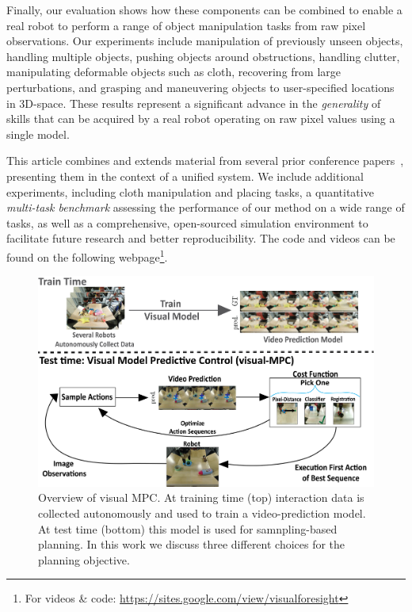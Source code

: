 Finally, our evaluation shows how these components can be combined to enable a real robot to perform a range of object manipulation tasks from raw pixel observations. Our experiments include manipulation of previously unseen objects, handling multiple objects, pushing objects around obstructions, handling clutter, manipulating deformable objects such as cloth, recovering from large perturbations, and grasping and maneuvering objects to user-specified locations in 3D-space. These results represent a significant advance in the \emph{generality} of skills that can be acquired by a real robot operating on raw pixel values using a single model.

This article combines and extends material from several prior conference papers~\cite{foresight,sna,ebert2018robustness,flo}, presenting them in the context of a unified system. We include additional experiments, including cloth manipulation and placing tasks, a quantitative \emph{multi-task benchmark} assessing the performance of our method on a wide range of tasks, as well as a comprehensive, open-sourced simulation environment to facilitate future research and better reproducibility. The code and videos can be found on the following webpage\footnote{For videos \& code: \url{https://sites.google.com/view/visualforesight}}.

\begin{figure}[t]
\centering
\includegraphics[width=\columnwidth,trim={0mm 0 0 0},clip]{images_general/overview_roughdraft.png}
\caption{\small{Overview of visual MPC. At training time (top) interaction data is collected autonomously and used to train a video-prediction model. At test time (bottom) this model is used for samnpling-based planning. In this work we discuss three different choices for the planning objective.}}
\label{fig:overview}
\end{figure}




 





